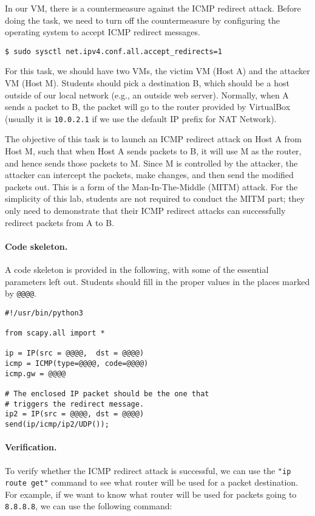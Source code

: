 In our VM, there is a countermeasure against the ICMP redirect attack. Before doing
the task, we need to turn off the countermeasure by configuring the operating system
to accept ICMP redirect messages. 

\begin{lstlisting}
$ sudo sysctl net.ipv4.conf.all.accept_redirects=1
\end{lstlisting}

For this task, we should have two VMs, the victim VM (Host A) and 
the attacker VM (Host M). Students should pick a destination B, which
should be a host outside of our local network (e.g., an outside web server). 
Normally, when A sends a packet to B, the packet will go to the 
router provided by VirtualBox (usually it is \texttt{10.0.2.1} if we use
the default IP prefix for NAT Network). 

The objective of this task is to launch an ICMP redirect attack on Host A 
from Host M, such that when Host A sends packets to B, 
it will use M as the router, and hence sends those packets to M. 
Since M is controlled by the attacker, the attacker can 
intercept the packets, make changes, and then send 
the modified packets out. This is a form of the Man-In-The-Middle (MITM) attack. 
For the simplicity of this lab, students are not required to 
conduct the MITM part; they only need to demonstrate that 
their ICMP redirect attacks can successfully redirect
packets from A to B.


\paragraph{Code skeleton.} A code skeleton is provided in the following, with
some of the essential parameters left out. Students should fill in the proper 
values in the places marked by \texttt{@@@@}.  


\begin{lstlisting}
#!/usr/bin/python3

from scapy.all import *

ip = IP(src = @@@@,  dst = @@@@)
icmp = ICMP(type=@@@@, code=@@@@)
icmp.gw = @@@@

# The enclosed IP packet should be the one that 
# triggers the redirect message. 
ip2 = IP(src = @@@@, dst = @@@@)
send(ip/icmp/ip2/UDP());
\end{lstlisting}
 

\paragraph{Verification.}
To verify whether the ICMP redirect attack is successful, we can use 
the \texttt{"ip route get"} command to see what router will be used for a 
packet destination. For example, if we want to know
what router will be used for packets going to \texttt{8.8.8.8}, we can use 
the following command: 

